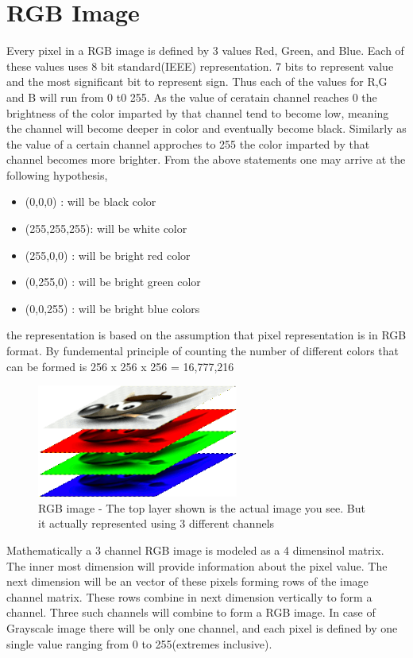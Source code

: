 \documentclass[11pt]{article}
\begin{document}
\section{RGB Image}
\label{sec-3}
Every pixel in a RGB image is defined by 3 values Red, Green, and Blue. Each of these values   
uses 8 bit standard(IEEE) representation. 7 bits to represent value and the most significant bit   
to represent sign. Thus each of the values for R,G and B will run from 0 t0 255. As the value of   
ceratain channel reaches 0 the brightness of the color imparted by that channel tend to become low, meaning the channel will become deeper in color and eventually become black.
Similarly as the value of a certain channel approches to 255 the color imparted by that channel    becomes
more brighter. From the above statements one may arrive at the following hypothesis,   
\begin{itemize}
\item (0,0,0) : will be black color
\item (255,255,255): will be white color
\item (255,0,0) : will be bright red color
\item (0,255,0) : will be bright green color
\item (0,0,255) : will be bright blue colors
\end{itemize}
the representation is based on the assumption that pixel representation is in RGB format.   
By fundemental principle of counting the number of different colors that can be formed is   
256 x 256 x 256 = 16,777,216    
\begin{figure}[htb]
\centering
\includegraphics[width=250px]{./rgb.png}
\caption{\label{fig1}RGB image - The top layer shown is the actual image you see. But it actually represented using 3 different channels}
\end{figure}

Mathematically a 3 channel RGB image is modeled as a 4 dimensinol matrix. The inner most dimension   
will provide information about the pixel value. The next dimension will be an vector of these pixels forming   
rows of the image channel matrix. These rows combine in next dimension vertically to form a channel. Three such   
channels will combine to form a RGB image. In case of Grayscale image there will be only one channel, and each pixel   
is defined by one single value ranging from 0 to 255(extremes inclusive).  
\end{document}
